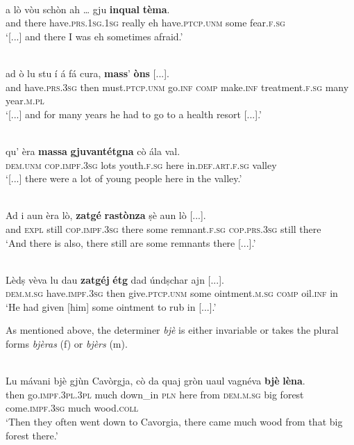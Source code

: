 \ea
\label{}
\\
\gll  [...] a lò vòu schòn ah … gju \textbf{inqual} \textbf{tèma}.  \\
{} and there have.\textsc{prs.1sg.1sg} really eh {} have.\textsc{ptcp.unm} some fear.\textsc{f.sg} \\
\glt `[...] and there I was eh sometimes afraid.'
\z

\ea
\label{}
\\
\gll  [...] ad ò lu stu í á fá cura, \textbf{mass}’ \textbf{òns} [...].\\
{} and have.\textsc{prs.3sg} then must.\textsc{ptcp.unm} go.\textsc{inf} \textsc{comp} make.\textsc{inf} treatment.\textsc{f.sg} many year.\textsc{m.pl}\\
\glt `[...] and for many years he had to go to a health resort [...].'
\z

\ea
\label{}
\\
\gll    [...] qu’ èra \textbf{massa} \textbf{gjuvantétgna} cò ála val. \\
{} \textsc{dem.unm} \textsc{cop.impf.3sg} lots youth.\textsc{f.sg}  here in.\textsc{def.art.f.sg} valley\\
\glt `[...] there were a lot of young people here in the valley.'
\z

\ea
\label{}
\\
\gll Ad i aun èra lò, \textbf{zatgé} \textbf{rastònza} ṣè aun lò [...].\\
and \textsc{expl} still \textsc{cop.impf.3sg} there some remnant.\textsc{f.sg} \textsc{cop.prs.3sg} still there\\
\glt `And there is also, there still are some remnants there [...].'
\z

\ea\label{}
\\
\gll  Lèdṣ vèva lu dau \textbf{zatgéj} \textbf{étg} dad úndṣchar ajn [...].\\
\textsc{dem.m.sg} have.\textsc{impf.3sg} then  give.\textsc{ptcp.unm} some ointment.\textsc{m.sg} \textsc{comp} oil.\textsc{inf} in\\
\glt `He had given [him] some ointment to rub in [...].'
\z

As mentioned above, the determiner \textit{bjè} is either invariable or takes the plural forms \textit{bjèras} (f) or \textit{bjèrs} (m).

\ea
\label{}
\\
\gll  Lu mávani bjè gjùn Cavòrgja, cò da quaj gròn uaul vagnéva \textbf{bjè} \textbf{lèna}.\\
then go.\textsc{impf.3pl.3pl} much down\_in \textsc{pln} here from \textsc{dem.m.sg} big forest come.\textsc{impf.3sg} much wood.\textsc{coll}  \\
\glt `Then they often went down to Cavorgia, there came much wood from that big forest there.'
\z

